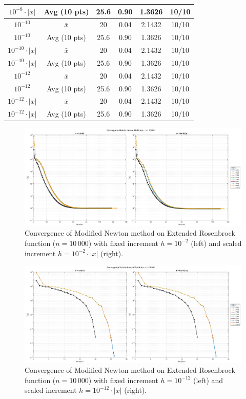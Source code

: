 \documentclass[a4paper,12pt]{article}
\begin{document}
\begin{table}[htbp]
{\begin{tabular}{|c|c|c|c|c|c|}
				$10^{-8}\cdot|x|$ & Avg (10 pts) & 25.6 & 0.90 & 1.3626 & 10/10 \\
				\hline
				$10^{-10}$ & $\bar{x}$ & 20 & 0.04 & 2.1432 & 10/10 \\
				$10^{-10}$ & Avg (10 pts) & 25.6 & 0.90 & 1.3626 & 10/10 \\
				$10^{-10}\cdot|x|$ & $\bar{x}$ & 20 & 0.04 & 2.1432 & 10/10 \\
				$10^{-10}\cdot|x|$ & Avg (10 pts) & 25.6 & 0.90 & 1.3626 & 10/10 \\
				\hline
				$10^{-12}$ & $\bar{x}$ & 20 & 0.04 & 2.1432 & 10/10 \\
				$10^{-12}$ & Avg (10 pts) & 25.6 & 0.90 & 1.3626 & 10/10 \\
				$10^{-12}\cdot|x|$ & $\bar{x}$ & 20 & 0.04 & 2.1432 & 10/10 \\
				$10^{-12}\cdot|x|$ & Avg (10 pts) & 25.6 & 0.90 & 1.3626 & 10/10 \\
				\hline
			\end{tabular}%
		}
		\label{tab:fd_er_10000}
	\end{table}
	
	\newpage
	\begin{figure}[H]
		\centering
		\includegraphics[width=\textwidth]{../immagini/ext_10k_h2.png}
		\caption{Convergence of Modified Newton method on Extended Rosenbrock function ($n=10\,000$) with fixed increment $h = 10^{-2}$ (left) and scaled increment $h = 10^{-2}\cdot|x|$ (right).}
		\label{fig:fd_10k_h2}
	\end{figure}
	
	\begin{figure}[htbp]
		\centering
		\includegraphics[width=\textwidth]{../immagini/ext_10k_h12.png}
		\caption{Convergence of Modified Newton method on Extended Rosenbrock function ($n=10\,000$) with fixed increment $h = 10^{-12}$ (left) and scaled increment $h = 10^{-12}\cdot|x|$ (right).}
		\label{fig:fd_10k_h12}
	\end{figure}
	\newpage
\end{document}
